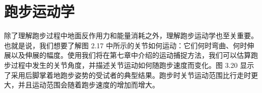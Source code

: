 \section{跑步运动学}

除了理解跑步过程中地面反作用力和能量消耗之外，理解跑步运动学也至关重要。
也就是说，我们想要了解图 2.17 中所示的关节如何运动：它们何时弯曲、何时伸展以及伸展的幅度。使用我们将在第七章中介绍的运动捕捉方法，我们可以估算跑步过程中发生的关节角度，并描述关节运动如何随跑步速度而变化。图 3.20 显示了采用后脚掌着地跑步姿势的受试者的典型结果。跑步时关节运动范围比行走时更大，并且运动范围会随着跑步速度的增加而增大。










